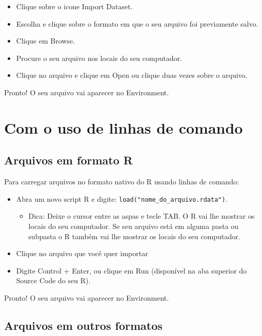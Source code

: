 \documentclass[
  brazil,
]{book}
\providecommand{\tightlist}{%
  \setlength{\itemsep}{0pt}\setlength{\parskip}{0pt}}
\begin{document}
\begin{itemize}
\tightlist
\item
  Clique sobre o icone Import Dataset.
\item
  Escolha e clique sobre o formato em que o seu arquivo foi previamente salvo.
\item
  Clique em Browse.
\item
  Procure o seu arquivo nos locais do seu computador.
\item
  Clique no arquivo e clique em Open ou clique duas vezes sobre o arquivo.
\end{itemize}

Pronto! O seu arquivo vai aparecer no Environment.

\hypertarget{com-o-uso-de-linhas-de-comando}{%
\section{Com o uso de linhas de comando}\label{com-o-uso-de-linhas-de-comando}}

\hypertarget{arquivos-em-formato-r-1}{%
\subsection{Arquivos em formato R}\label{arquivos-em-formato-r-1}}

Para carregar arquivos no formato nativo do R usando linhas de comando:

\begin{itemize}
\tightlist
\item
  Abra um novo script R e digite: \texttt{load("nome\_do\_arquivo.rdata")}.

  \begin{itemize}
  \tightlist
  \item
    Dica: Deixe o cursor entre as aspas e tecle TAB. O R vai lhe mostrar os locais do seu computador. Se seu arquivo está em alguma pasta ou subpasta o R também vai lhe mostrar os locais do seu computador.
  \end{itemize}
\item
  Clique no arquivo que você quer importar
\item
  Digite Control + Enter, ou clique em Run (disponível na aba superior do Source Code do seu R).
\end{itemize}

Pronto! O seu arquivo vai aparecer no Environment.

\hypertarget{arquivos-em-outros-formatos-1}{%
\subsection{Arquivos em outros formatos}\label{arquivos-em-outros-formatos-1}}
\end{document}
